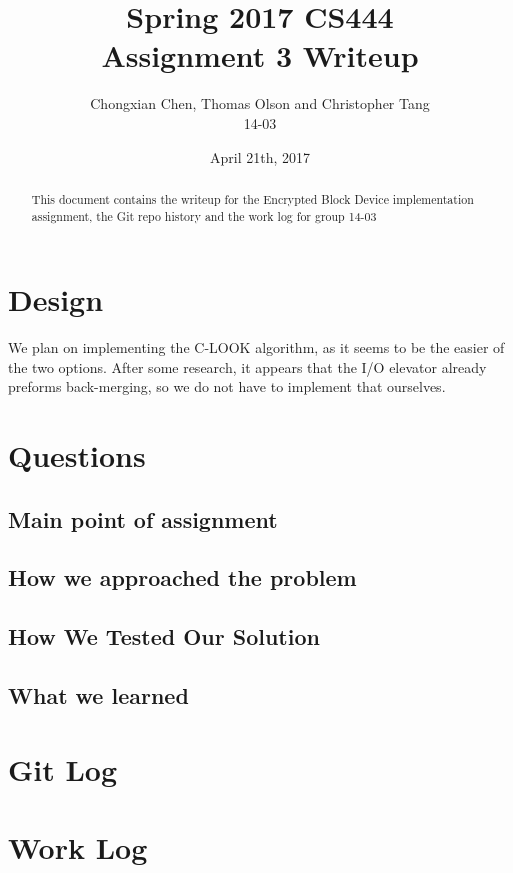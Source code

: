 \documentclass[10pt,onecolumn,journal,draftclsnofoot,letterpaper]{IEEEtran}
\begin{document}
\begin{titlepage}
  \title{Spring 2017 CS444\\Assignment 3 Writeup}
  \author{Chongxian Chen, Thomas Olson and Christopher Tang\\14-03}
  \date{April 21th, 2017}
  \maketitle
  \vspace{4cm}
  \begin{abstract}
  \noindent This document contains the writeup for the Encrypted Block Device implementation assignment, the Git repo history and the work log for group 14-03
 \end{abstract}
    \bigskip
    \bigskip
    \bigskip
    \bigskip
    \bigskip



\end{titlepage}

\section{Design}

We plan on implementing the C-LOOK algorithm, as it seems to be the easier of the two options. After some research, it appears that the I/O elevator already preforms back-merging, so we do not have to implement that ourselves.

\section{Questions}

\subsection{Main point of assignment}


\subsection{How we approached the problem}


\subsection{How We Tested Our Solution}


\subsection{What we learned}



\section{Git Log}



\section{Work Log}
\end{document}
